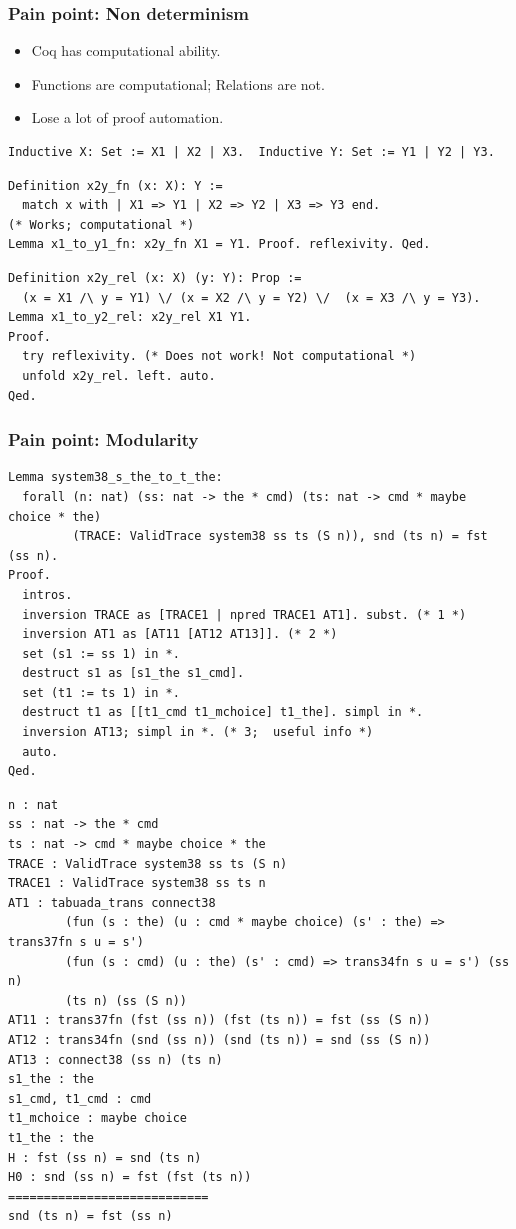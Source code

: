 \documentclass{beamer}
\begin{document}
\begin{frame}[fragile]
\frametitle{Pain point: Non determinism}
    \begin{itemize}
            \item Coq has computational ability.
            \item Functions are computational; Relations are not.
            \item Lose a lot of proof automation.
    \end{itemize}

\pause

{\footnotesize
\begin{verbatim}
Inductive X: Set := X1 | X2 | X3.  Inductive Y: Set := Y1 | Y2 | Y3. 
\end{verbatim}
\pause
\begin{verbatim}
Definition x2y_fn (x: X): Y :=
  match x with | X1 => Y1 | X2 => Y2 | X3 => Y3 end.
(* Works; computational *)
Lemma x1_to_y1_fn: x2y_fn X1 = Y1. Proof. reflexivity. Qed.
\end{verbatim}
\pause

\begin{verbatim}
Definition x2y_rel (x: X) (y: Y): Prop :=
  (x = X1 /\ y = Y1) \/ (x = X2 /\ y = Y2) \/  (x = X3 /\ y = Y3).
Lemma x1_to_y2_rel: x2y_rel X1 Y1.
Proof.
  try reflexivity. (* Does not work! Not computational *)
  unfold x2y_rel. left. auto.
Qed.
\end{verbatim}
}
\end{frame}

\begin{frame}[fragile]
\frametitle{Pain point: Modularity}
{\tiny
  \begin{verbatim}
Lemma system38_s_the_to_t_the: 
  forall (n: nat) (ss: nat -> the * cmd) (ts: nat -> cmd * maybe choice * the)
         (TRACE: ValidTrace system38 ss ts (S n)), snd (ts n) = fst (ss n).
Proof.
  intros.
  inversion TRACE as [TRACE1 | npred TRACE1 AT1]. subst. (* 1 *)
  inversion AT1 as [AT11 [AT12 AT13]]. (* 2 *)
  set (s1 := ss 1) in *.
  destruct s1 as [s1_the s1_cmd].
  set (t1 := ts 1) in *.
  destruct t1 as [[t1_cmd t1_mchoice] t1_the]. simpl in *.
  inversion AT13; simpl in *. (* 3;  useful info *)
  auto.
Qed.
\end{verbatim}
\pause
\begin{verbatim}  
n : nat
ss : nat -> the * cmd
ts : nat -> cmd * maybe choice * the
TRACE : ValidTrace system38 ss ts (S n)
TRACE1 : ValidTrace system38 ss ts n
AT1 : tabuada_trans connect38
        (fun (s : the) (u : cmd * maybe choice) (s' : the) => trans37fn s u = s')
        (fun (s : cmd) (u : the) (s' : cmd) => trans34fn s u = s') (ss n) 
        (ts n) (ss (S n))
AT11 : trans37fn (fst (ss n)) (fst (ts n)) = fst (ss (S n))
AT12 : trans34fn (snd (ss n)) (snd (ts n)) = snd (ss (S n))
AT13 : connect38 (ss n) (ts n)
s1_the : the
s1_cmd, t1_cmd : cmd
t1_mchoice : maybe choice
t1_the : the
H : fst (ss n) = snd (ts n)
H0 : snd (ss n) = fst (fst (ts n))
============================
snd (ts n) = fst (ss n)
\end{verbatim}
}
\end{frame}
\end{document}
